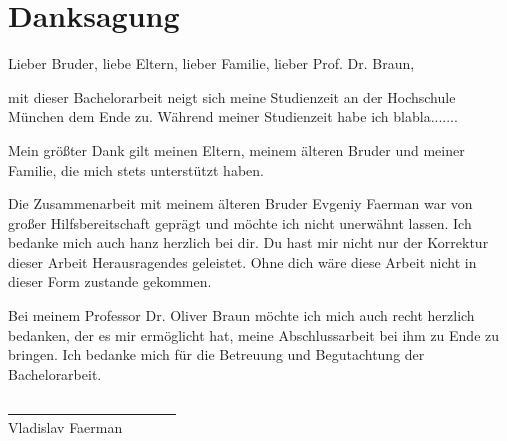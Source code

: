 \chapter*{Danksagung}

Lieber Bruder, liebe Eltern, lieber Familie, lieber Prof. Dr. Braun,

mit dieser Bachelorarbeit neigt sich meine Studienzeit an der Hochschule München dem Ende zu. Während meiner Studienzeit habe ich blabla.......

Mein größter Dank gilt meinen Eltern, meinem älteren Bruder und meiner Familie, die mich stets unterstützt haben.

Die Zusammenarbeit mit meinem älteren Bruder Evgeniy Faerman war von großer Hilfsbereitschaft geprägt und möchte ich nicht unerwähnt lassen. Ich bedanke mich auch hanz herzlich bei dir. Du hast mir nicht nur der Korrektur dieser Arbeit Herausragendes geleistet. Ohne dich wäre diese Arbeit nicht in dieser Form zustande gekommen.

Bei meinem Professor Dr. Oliver Braun möchte ich mich auch recht herzlich bedanken, der es mir ermöglicht hat, meine Abschlussarbeit bei ihm zu Ende zu bringen. Ich bedanke mich für die Betreuung und Begutachtung der Bachelorarbeit.

\vskip 1.5cm

\underline{~~~~~~~~~~~~~~~~~~~~~~~~}\\
Vladislav Faerman\\

 